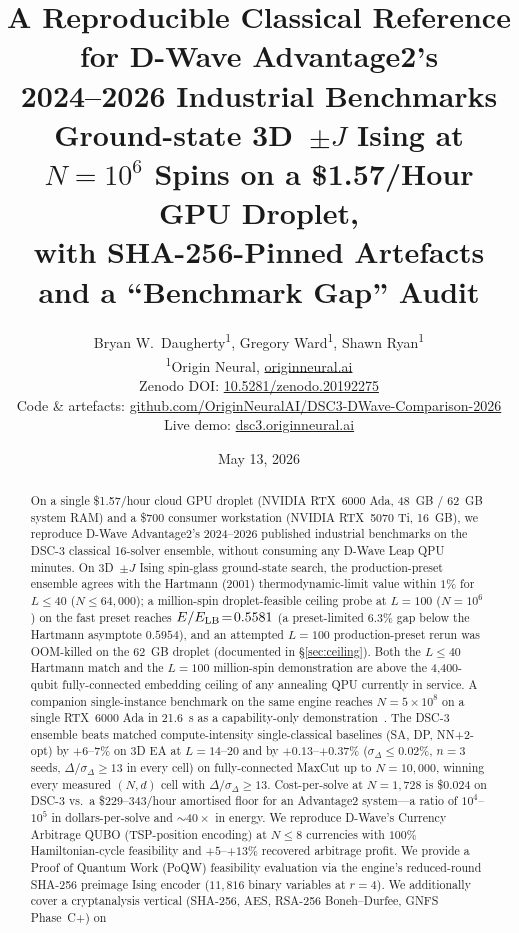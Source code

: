\documentclass[11pt,a4paper]{article}
\title{\textbf{A Reproducible Classical Reference for D-Wave Advantage2's\\
2024--2026 Industrial Benchmarks}\\[0.3em]
\large Ground-state 3D~$\pm J$ Ising at $N\!=\!10^{6}$ Spins on a
\$1.57/Hour GPU Droplet,\\
\large with SHA-256-Pinned Artefacts and a ``Benchmark Gap'' Audit}
\author{
Bryan W.\ Daugherty\textsuperscript{1}, Gregory Ward\textsuperscript{1}, Shawn Ryan\textsuperscript{1}\\
\small\textsuperscript{1}Origin Neural, \href{https://originneural.ai}{originneural.ai}\\
\small Zenodo DOI: \href{https://doi.org/10.5281/zenodo.20192275}{10.5281/zenodo.20192275}\\
\small Code \& artefacts: \href{https://github.com/OriginNeuralAI/DSC3-DWave-Comparison-2026}{github.com/OriginNeuralAI/DSC3-DWave-Comparison-2026}\\
\small Live demo: \href{https://dsc3.originneural.ai/}{dsc3.originneural.ai}
}
\date{May 13, 2026}
\begin{document}
\maketitle

\begin{abstract}
\noindent
On a single \$1.57/hour cloud GPU droplet (NVIDIA RTX~6000 Ada,
48~GB / 62~GB system RAM) and a \$700 consumer workstation
(NVIDIA RTX~5070 Ti, 16~GB), we reproduce D-Wave Advantage2's
2024--2026 published industrial benchmarks on the DSC-3 classical
16-solver ensemble, without consuming any D-Wave Leap QPU minutes.
On 3D~$\pm J$ Ising spin-glass ground-state search, the
production-preset ensemble agrees with the Hartmann (2001)
thermodynamic-limit value within $1\%$ for $L\!\le\!40$
($N\!\le\!64{,}000$); a million-spin droplet-feasible ceiling probe
at $L\!=\!100$ ($N\!=\!10^{6}$) on the fast preset reaches
$E/E_{\rm LB}\!=\!0.5581$ (a preset-limited $6.3\%$ gap below the
Hartmann asymptote $0.5954$), and an attempted $L\!=\!100$
production-preset rerun was OOM-killed on the 62~GB droplet
(documented in \S\ref{sec:ceiling}). Both the $L\!\le\!40$ Hartmann match
and the $L\!=\!100$ million-spin demonstration are above the
4{,}400-qubit fully-connected embedding ceiling of any annealing
QPU currently in service. A companion single-instance benchmark on
the same engine reaches $N\!=\!5\!\times\!10^{8}$ on a single
RTX~6000 Ada in 21.6~s as a capability-only
demonstration~\cite{daugherty_dsc3_benchmark}. The DSC-3 ensemble beats matched
compute-intensity single-classical baselines (SA, DP, NN+2-opt) by
$+6$--$7\%$ on 3D EA at $L\!=\!14$--$20$ and by $+0.13$--$+0.37\%$
($\sigma_\Delta\!\le\!0.02\%$, $n\!=\!3$ seeds, $\Delta/\sigma_\Delta\!\ge\!13$
in every cell) on fully-connected MaxCut up to $N\!=\!10{,}000$, winning every measured $(N, d)$ cell with $\Delta/\sigma_\Delta\ge 13$.
Cost-per-solve at $N\!=\!1{,}728$ is \$0.024 on DSC-3 vs.\ a
\$229--343/hour amortised floor for an Advantage2 system---a ratio of
$10^{4}$--$10^{5}$ in dollars-per-solve and $\sim 40\times$ in energy.
We reproduce D-Wave's Currency Arbitrage QUBO (TSP-position encoding)
at $N\!\le\!8$ currencies with $100\%$ Hamiltonian-cycle feasibility
and $+5$--$+13\%$ recovered arbitrage profit. We provide a Proof of
Quantum Work (PoQW) feasibility evaluation via the engine's
reduced-round SHA-256 preimage Ising encoder ($11{,}816$ binary
variables at $r\!=\!4$). We additionally cover a cryptanalysis
vertical (SHA-256, AES, RSA-256 Boneh--Durfee, GNFS Phase~C+) on

\end{abstract}
\end{document}
